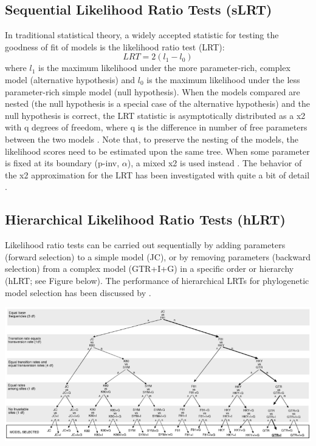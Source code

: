 \subsection{Sequential Likelihood Ratio Tests (sLRT)}
\label{sec:slrt}

In traditional statistical theory, a widely accepted statistic for testing the goodness of fit of models is the likelihood ratio test (LRT): 
\[
LRT=2(l_1-l_0)
\]
where $l_1$ is the maximum likelihood under the more parameter-rich, complex model (alternative hypothesis) and $l_0$ is the maximum likelihood under the less parameter-rich simple model (null hypothesis).
 When the models compared are nested (the null hypothesis is a special case of the alternative hypothesis) and the null hypothesis is correct, the LRT statistic is asymptotically distributed as a x2 with q degrees of freedom, where q is the difference in number of free parameters between the two models \citep{Kendall-1979, Goldman-1993b}. Note that, to preserve the nesting of the models, the likelihood scores need to be estimated upon the same tree. When some parameter is fixed at its boundary (p-inv, $\alpha$), a mixed x2 is used instead \citep{Ohta-1992, Goldman-2000}. The behavior of the x2 approximation for the LRT has been investigated with quite a bit of detail \citep{Goldman-1993a, Goldman-1993b, Yang-1995, Whelan-1999, Goldman-2000}.

\subsection{Hierarchical Likelihood Ratio Tests (hLRT)}
\label{sec:hlrt}

Likelihood ratio tests can be carried out sequentially by adding parameters (forward selection) to a simple model (JC), or by removing parameters (backward selection) from a complex model (GTR+I+G) in a specific order or hierarchy (hLRT; see Figure below). The performance of hierarchical LRTs for phylogenetic model selection has been discussed by \citet{Posada-2004}.

\begin{center}
\includegraphics[width=.9\textwidth]{images/hLRT.png}
\end{center}

